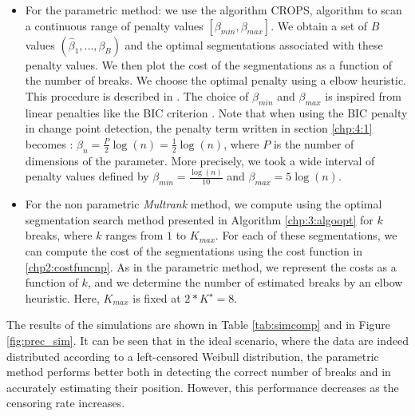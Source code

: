     \begin{itemize}
        \item For the parametric method: we use the algorithm CROPS, algorithm to scan a continuous range of penalty values $[\beta_{min},\beta_{max}]$. We obtain a set of $B$ values $(\hat \beta_1,...,\beta_B)$ and the optimal segmentations associated with these penalty values. We then plot the cost of the segmentations as a function of the number of breaks. We choose the optimal penalty using a elbow heuristic. This procedure is described in \cite{haynes2014}. The choice of $\beta_{min}$ and $\beta_{max}$ is inspired from linear penalties like the BIC criterion \cite{YAO1988181}. Note that when using the BIC penalty in change point detection, the penalty term written in section \ref{chp:4:1} becomes : $\beta_n = \frac{P}{2}\log(n) = \frac{1}{2}\log(n)$, where $P$ is the number of dimensions of the parameter. More precisely, we took a wide interval of penalty values defined by $\beta_{min} = \frac{\log(n)}{10}$ and $\beta_{max} = 5\log(n)$.
        \item For the non parametric \textit{Multrank} method, we compute using the optimal segmentation search method presented in Algorithm \ref{chp:3:algoopt} for $k$ breaks, where $k$ ranges from $1$ to $K_{max}$. For each of these segmentations, we can compute the cost of the segmentations using the cost function in \ref{chp2:costfuncnp}. As in the parametric method, we represent the costs as a function of $k$, and we determine the number of estimated breaks by an elbow heuristic. Here, $K_{max}$ is fixed at $2*K^\star = 8$.
    \end{itemize}
The results of the simulations are shown in Table \ref{tab:simcomp} and in Figure \ref{fig:prec_sim}. It can be seen that in the ideal scenario, where the data are indeed distributed according to a left-censored Weibull distribution, the parametric method performs better both in detecting the correct number of breaks and in accurately estimating their position. However, this performance decreases as the censoring rate increases.


